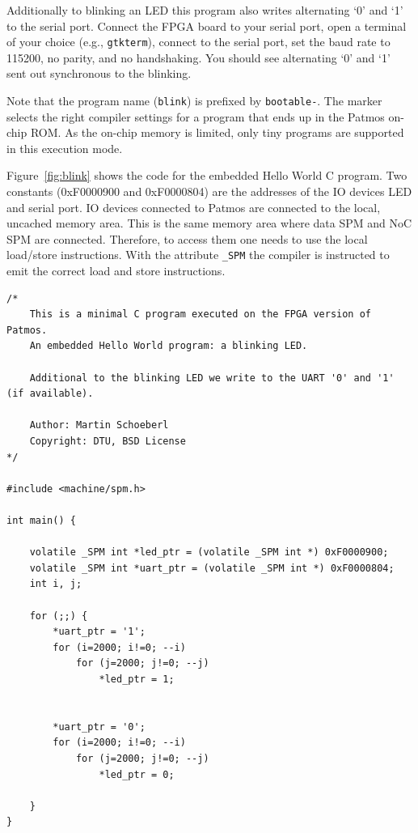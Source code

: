 \documentclass[a4paper,fontsize=10pt,twoside,DIV15,BCOR12mm,headinclude=true,footinclude=false,pagesize,bibtotoc]{scrbook}
\newcommand{\code}[1]{{\texttt{#1}}}
\newcommand{\comment}[3]{

\textsf{\textbf{#1}} {\color{#3}#2}}
\newcommand{\martin}[1]{\comment{Martin}{#1}{Blue}}
\renewcommand{\martin}[1]{}
\begin{document}
Additionally to blinking an LED this program also writes alternating `0' and `1'
to the serial port. Connect the FPGA board to your serial port,
open a terminal of your choice (e.g., \code{gtkterm}), connect to the serial port,
set the baud rate to 115200, no parity, and no handshaking.
You should see alternating `0' and `1' sent out synchronous to the blinking.

Note that the program name (\code{blink}) is prefixed by \code{bootable-}.
The marker selects the right compiler settings for a program that ends up in
the Patmos on-chip ROM. As the on-chip memory is limited, only tiny programs
are supported in this execution mode.

Figure~\ref{fig:blink} shows the code for the embedded Hello World
C program. Two constants (0xF0000900 and 0xF0000804) are the addresses
of the IO devices LED and serial port. IO devices connected to Patmos are
connected to the local, uncached memory area. This is the same memory
area where data SPM and NoC SPM are connected. Therefore, to access them
one needs to use the local load/store instructions. With the attribute \code{\_SPM}
the compiler is instructed to emit the correct load and store instructions.

\begin{lstlisting}[float,caption={A blinking LED\label{fig:blink}}]
/*
    This is a minimal C program executed on the FPGA version of Patmos.
    An embedded Hello World program: a blinking LED.

    Additional to the blinking LED we write to the UART '0' and '1' (if available).

    Author: Martin Schoeberl
    Copyright: DTU, BSD License
*/

#include <machine/spm.h>

int main() {

    volatile _SPM int *led_ptr = (volatile _SPM int *) 0xF0000900;
    volatile _SPM int *uart_ptr = (volatile _SPM int *) 0xF0000804;
    int i, j;

    for (;;) {
        *uart_ptr = '1';
        for (i=2000; i!=0; --i)
            for (j=2000; j!=0; --j)
                *led_ptr = 1;


        *uart_ptr = '0';
        for (i=2000; i!=0; --i)
            for (j=2000; j!=0; --j)
                *led_ptr = 0;

    }
}
\end{lstlisting}

\martin{TODO: we need to streamline the make process a little bit.
The targets might be a little bit confusing. Patmos is compiled two times.}
\end{document}
